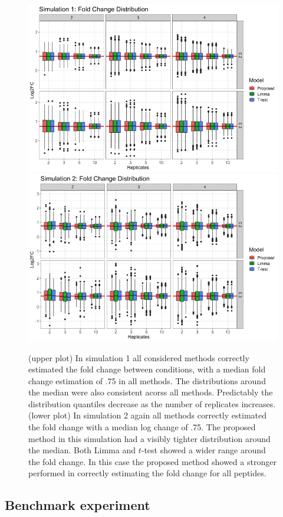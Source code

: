 \documentclass{mcp}
\begin{document}
\begin{figure}[h!]
\centering
\includegraphics[width=.85\textwidth]{sim_new/sim1_FC_boxplot}
\includegraphics[width=.85\textwidth]{sim_new/sim3_FC_boxplot}
\caption{(upper plot) In simulation 1 all considered methods correctly estimated the fold change between conditions, with a median fold change estimation of .75 in all methods. The distributions around the median were also consistent acorss all methods. Predictably the distribution quantiles decrease as the number of replicates increases. (lower plot) In simulation 2 again all methods correctly estimated the fold change with a median log change of .75. The proposed method in this simulation had a visibly tighter distribution around the median. Both Limma and $t$-test showed a wider range around the fold change. In this case the proposed method showed a stronger performed in correctly estimating the fold change for all peptides. \label{fig:fc_boxplot}}
\end{figure}

\clearpage
\subsection{Benchmark experiment}
\label{sec:benchmark}
\end{document}
